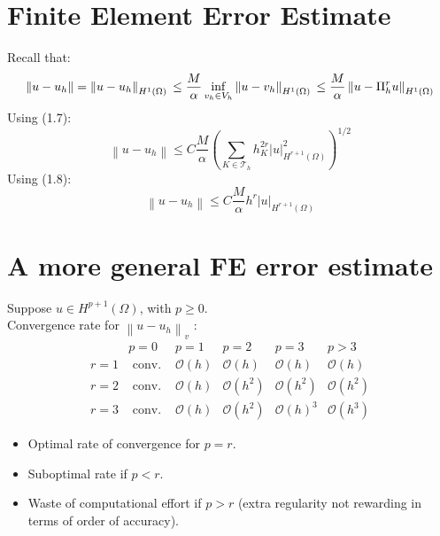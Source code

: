 \documentclass[11pt]{book}
\begin{document}
\section{Finite Element Error Estimate}
Recall that:
\begin{equation}
\left\|u-u_{h}\right\| = \left\|u-u_{h}\right\|_{H^{1}(\Omega)} \\
\leq \frac{M}{\alpha} \inf_{v_{h} \in V_{h}} \left\|u-v_{h}\right\|_{H^{1}(\Omega)} \\
\leq \frac{M}{\alpha} \left\|u-\Pi_{h}^{r} u\right\|_{H^{1}(\Omega)}
\end{equation}
Using (1.7):
\begin{equation*}
\left\|u-u_{h}\right\| \leq C \frac{M}{\alpha}\left(\sum_{K \in \mathcal{T}_{h}} h_{K}^{2 r}|u|_{H^{r+1}(\Omega)}^{2}\right)^{1 / 2}
\end{equation*}
Using (1.8):
\begin{equation*}
\left\|u-u_{h}\right\| \leq C \frac{M}{\alpha} h^{r}|u|_{H^{r+1}(\Omega)}
\end{equation*}

\section{A more general FE error estimate}
Suppose $u \in H^{p+1}(\Omega)$, with $p \geq 0$.\\ 
Convergence rate for $\left\|u-u_{h}\right\|_{v}$ :\\
$$
\begin{array}{l|lllll} 
& p=0 & p=1 & p=2 & p=3 & p>3 \\
\hline r=1 & \text { conv. } & \mathcal{O}(h) & \mathcal{O}(h) & \mathcal{O}(h) & \mathcal{O}(h) \\
r=2 & \text { conv. } & \mathcal{O}(h) & \mathcal{O}\left(h^{2}\right) & \mathcal{O}\left(h^{2}\right) & \mathcal{O}\left(h^{2}\right) \\
r=3 & \text { conv. } & \mathcal{O}(h) & \mathcal{O}\left(h^{2}\right) & \mathcal{O}(h)^{3} & \mathcal{O}\left(h^{3}\right)
\end{array}
$$

\begin{itemize}
  \item Optimal rate of convergence for $p=r$.
  \item Suboptimal rate if $p<r$.
  \item Waste of computational effort if $p>r$ (extra regularity not rewarding in terms of order of accuracy).
\end{itemize}
\end{document}
